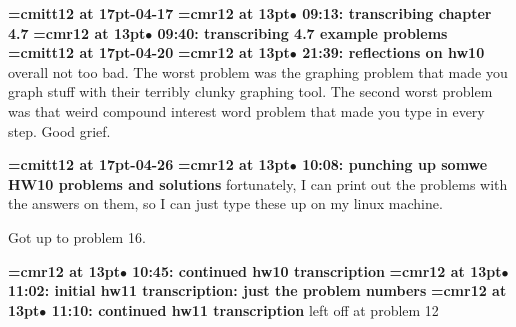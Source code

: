 {\medskip\noindent\bf\font\titlefont=cmitt12 at 17pt-04-17}\medskip
{\smallskip\noindent\bf\font\titlefont=cmr12 at 13pt\titlefont $\bullet$ 09:13: transcribing chapter 4.7}\smallskip
{\smallskip\noindent\bf\font\titlefont=cmr12 at 13pt\titlefont $\bullet$ 09:40: transcribing 4.7 example problems}\smallskip
{\medskip\noindent\bf\font\titlefont=cmitt12 at 17pt-04-20}\medskip
{\smallskip\noindent\bf\font\titlefont=cmr12 at 13pt\titlefont $\bullet$ 21:39: reflections on hw10}\smallskip
overall not too bad. The worst problem was the graphing problem that made you graph stuff with their terribly clunky graphing tool. The second worst problem was that weird compound interest word problem that made you type in every step. Good grief.
\par

{\medskip\noindent\bf\font\titlefont=cmitt12 at 17pt-04-26}\medskip
{\smallskip\noindent\bf\font\titlefont=cmr12 at 13pt\titlefont $\bullet$ 10:08: punching up somwe HW10 problems and solutions}\smallskip
fortunately, I can print out the problems with the answers on them, so I can just type these up on my linux machine.
\par

Got up to problem 16.
\par

{\smallskip\noindent\bf\font\titlefont=cmr12 at 13pt\titlefont $\bullet$ 10:45: continued hw10 transcription}\smallskip
{\smallskip\noindent\bf\font\titlefont=cmr12 at 13pt\titlefont $\bullet$ 11:02: initial hw11 transcription: just the problem numbers}\smallskip
{\smallskip\noindent\bf\font\titlefont=cmr12 at 13pt\titlefont $\bullet$ 11:10: continued hw11 transcription}\smallskip
left off at problem 12
\par

